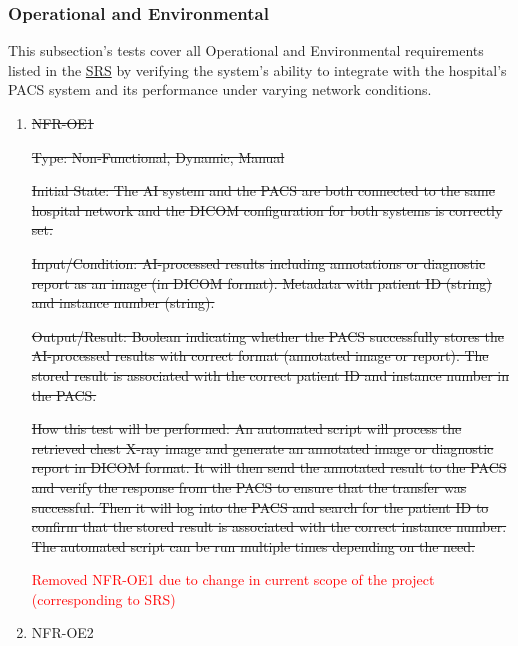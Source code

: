 \documentclass[12pt, titlepage]{article}
\begin{document}
\begin{enumerate}
\begin{enumerate}
\begin{enumerate}
\begin{enumerate}
\begin{enumerate}
\end{enumerate}

\subsubsection{Operational and Environmental}

This subsection's tests cover all Operational and Environmental requirements listed in the \href{https://github.com/RezaJodeiri/CXR-Capstone/blob/main/docs/SRS/SRS.pdf}{SRS} \citep{SRS}
 by verifying the system's ability to integrate with the hospital's PACS system and its performance under varying network conditions.

\begin{enumerate}

\item{\sout{NFR-OE1}\\}\label{NFR-OE1}

\sout{Type: Non-Functional, Dynamic, Manual}

\sout{Initial State: The AI system and the PACS are both connected to the same hospital network and the DICOM configuration for both systems is correctly set.}

\sout{Input/Condition: AI-processed results including annotations or diagnostic report as an image (in DICOM format). Metadata with patient ID (string) and instance number (string).}

\sout{Output/Result: Boolean indicating whether the PACS successfully stores the AI-processed results with correct format (annotated image or report). The stored result is associated with the correct patient ID and instance number in the PACS.}

\sout{How this test will be performed: An automated script will process the retrieved chest X-ray image and generate an annotated image or diagnostic report in DICOM format. It will then send the annotated result to the PACS and verify the response from the PACS to ensure that the transfer was successful. Then it will log into the PACS and search for the patient ID to confirm that the stored result is associated with the correct instance number. The automated script can be run multiple times depending on the need.}


\textcolor{red}{Removed NFR-OE1 due to change in current scope of the project (corresponding to SRS)}

\item{NFR-OE2\\}\label{NFR-OE2}


\end{enumerate}
\end{enumerate}
\end{enumerate}
\end{enumerate}
\end{enumerate}
\end{document}
